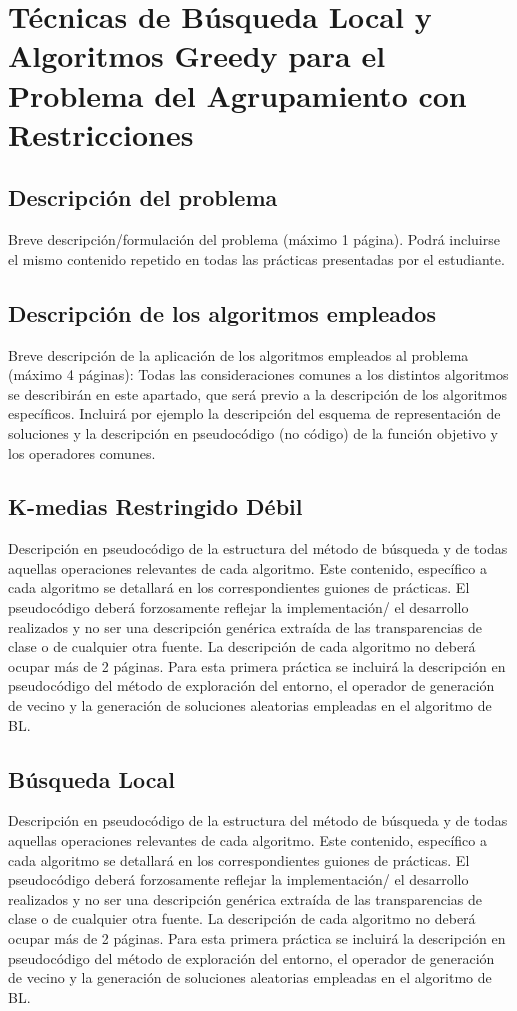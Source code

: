 \chapter{Técnicas de Búsqueda Local y Algoritmos Greedy para el Problema del Agrupamiento con Restricciones}

\section{Descripción del problema}
Breve descripción/formulación del problema (máximo 1 página). Podrá incluirse
el mismo contenido repetido en todas las prácticas presentadas por el estudiante.

\section{Descripción de los algoritmos empleados}
Breve descripción de la aplicación de los algoritmos empleados al problema
(máximo 4 páginas): Todas las consideraciones comunes a los distintos
algoritmos se describirán en este apartado, que será previo a la descripción de los
algoritmos específicos. Incluirá por ejemplo la descripción del esquema de
representación de soluciones y la descripción en pseudocódigo (no código) de la
función objetivo y los operadores comunes.

\section{K-medias Restringido Débil}
Descripción en pseudocódigo de la estructura del método de búsqueda y de
todas aquellas operaciones relevantes de cada algoritmo. Este contenido,
específico a cada algoritmo se detallará en los correspondientes guiones de
prácticas. El pseudocódigo deberá forzosamente reflejar la implementación/ el
desarrollo realizados y no ser una descripción genérica extraída de las
transparencias de clase o de cualquier otra fuente. La descripción de cada
algoritmo no deberá ocupar más de 2 páginas.
Para esta primera práctica se incluirá la descripción en pseudocódigo del método
de exploración del entorno, el operador de generación de vecino y la generación
de soluciones aleatorias empleadas en el algoritmo de BL.

\section{Búsqueda Local}
Descripción en pseudocódigo de la estructura del método de búsqueda y de
todas aquellas operaciones relevantes de cada algoritmo. Este contenido,
específico a cada algoritmo se detallará en los correspondientes guiones de
prácticas. El pseudocódigo deberá forzosamente reflejar la implementación/ el
desarrollo realizados y no ser una descripción genérica extraída de las
transparencias de clase o de cualquier otra fuente. La descripción de cada
algoritmo no deberá ocupar más de 2 páginas.
Para esta primera práctica se incluirá la descripción en pseudocódigo del método
de exploración del entorno, el operador de generación de vecino y la generación
de soluciones aleatorias empleadas en el algoritmo de BL.

